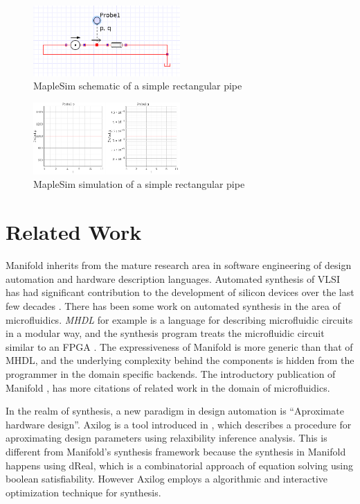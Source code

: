 \begin{figure}[ht]
  \caption{MapleSim schematic of a simple rectangular pipe}
  \centering
    \includegraphics[width=0.5\textwidth]{img/simple-pipe.png}
\end{figure}
\begin{figure}[ht]
  \caption{MapleSim simulation of a simple rectangular pipe}
  \centering
    \includegraphics[width=0.5\textwidth]{img/simple-pipe-simulation.png}
\end{figure}

\section{Related Work}
Manifold inherits from the mature research area in software  engineering of design automation and hardware description languages. Automated synthesis of VLSI has had significant contribution to the development of silicon devices over the last few decades \cite{MeadConway80}. There has been some work on automated synthesis in the area of microfluidics. \emph{MHDL} for example is a language for describing microfluidic circuits in a modular way, and the synthesis program treats the microfluidic circuit similar to an FPGA \cite{McDaniel13aspdac}. The expressiveness of Manifold is more generic than that of MHDL, and the underlying complexity behind the components is hidden from the programmer in the domain specific backends. The introductory publication of Manifold \cite{Berzish16cascon}, has more citations of related work in the domain of microfluidics.

In the realm of synthesis, a new paradigm in design automation is ``Aproximate hardware design''. Axilog is a tool introduced in  \cite{axilog}, which describes a procedure for aproximating design parameters using relaxibility inference analysis. This is different from Manifold's synthesis framework because the synthesis in Manifold happens using dReal, which is a combinatorial approach of equation solving using boolean satisfiability. However Axilog employs a algorithmic and interactive optimization technique for synthesis.

